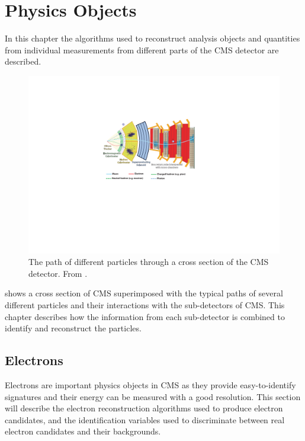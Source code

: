 \chapter{Physics Objects}
\label{chap:objects}

In this chapter the algorithms used to reconstruct analysis objects and
quantities from individual measurements from different parts of the CMS detector
are described.

\begin{figure}[htbp]
  \centering
  \includegraphics[trim=8cm 8cm 9cm 5cm, width=\textwidth]{slice}
  \caption[The path of different particles through a cross section of the CMS
detector.] {The path of different particles through a cross section of the CMS
detector. From \cite{cmsslice}.}
  \label{reco:crosssec}
\end{figure}

 shows a cross section of {CMS} superimposed with the
typical paths of several different particles and their interactions with the
sub-detectors of {CMS}.  This chapter describes how the information
from each sub-detector is combined to identify and reconstruct the particles.

\section{Electrons}
Electrons are important physics objects in CMS as they provide easy-to-identify
signatures and their energy can be measured with a good resolution. This section
will describe the electron reconstruction algorithms used to produce electron
candidates, and the identification variables used to discriminate between real
electron candidates and their backgrounds.

